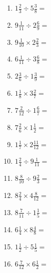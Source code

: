 \documentclass[12pt]{article}
\begin{document}
\begin{enumerate}
\item \large $ 1 \frac{2}{3} \div 5 \frac{3}{8} = $ \vspace{1.6cm}
\item \large $ 9 \frac{1}{11} \div 2 \frac{6}{9} = $ \vspace{1.6cm}
\item \large $ 9 \frac{1}{10} \times 2 \frac{2}{3} = $ \vspace{1.6cm}
\item \large $ 6 \frac{1}{11} \div 3 \frac{6}{8} = $ \vspace{1.6cm}
\item \large $ 2 \frac{3}{6} \div 1 \frac{3}{9} = $ \vspace{1.6cm}
\item \large $ 1 \frac{1}{8} \times 3 \frac{2}{7} = $ \vspace{1.6cm}
\newpage
\item \large $ 7 \frac{2}{12} \div 1 \frac{6}{7} = $ \vspace{1.6cm}
\item \large $ 7 \frac{2}{6} \times 1 \frac{1}{2} = $ \vspace{1.6cm}
\item \large $ 1 \frac{1}{7} \times 2 \frac{11}{12} = $ \vspace{1.6cm}
\item \large $ 1 \frac{2}{4} \div 9 \frac{1}{11} = $ \vspace{1.6cm}
\item \large $ 8 \frac{8}{10} \div 9 \frac{2}{3} = $ \vspace{1.6cm}
\item \large $ 8 \frac{2}{4} \times 4 \frac{8}{12} = $ \vspace{1.6cm}
\item \large $ 8 \frac{7}{11} \div 1 \frac{1}{5} = $ \vspace{1.6cm}
\item \large $ 6 \frac{1}{4} \times 8 \frac{4}{8} = $ \vspace{1.6cm}
\item \large $ 1 \frac{1}{2} \div 5 \frac{1}{5} = $ \vspace{1.6cm}
\item \large $ 6 \frac{7}{12} \times 6 \frac{1}{2} = $ \vspace{1.6cm}
\end{enumerate}
\newpage
\end{document}
